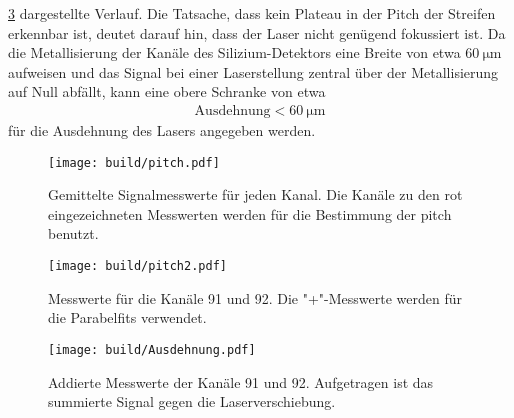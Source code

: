 \ref{fig:Ausdehnung} dargestellte Verlauf. Die Tatsache, dass kein Plateau in der Pitch der Streifen erkennbar ist, deutet darauf hin, dass der Laser
nicht genügend fokussiert ist. Da die Metallisierung der Kanäle des Silizium-Detektors eine Breite von etwa $\SI{60}{\micro\meter}$ aufweisen und das
Signal bei einer Laserstellung zentral über der Metallisierung auf Null abfällt, kann eine obere Schranke von etwa
\begin{align}
  \text{Ausdehnung} < \SI{60}{\micro\meter}
\end{align}
für die Ausdehnung des Lasers angegeben werden.

\begin{figure}
  \centering
  \texttt{[image: build/pitch.pdf]}
  \caption{Gemittelte Signalmesswerte für jeden Kanal. Die Kanäle zu den rot eingezeichneten Messwerten werden für die Bestimmung der pitch benutzt.}
  \label{fig:pitch}
\end{figure}

\begin{figure}
  \centering
  \texttt{[image: build/pitch2.pdf]}
  \caption{Messwerte für die Kanäle 91 und 92. Die "+"-Messwerte werden für die Parabelfits verwendet.}
  \label{fig:pitch2}
\end{figure}

\begin{figure}
  \centering
  \texttt{[image: build/Ausdehnung.pdf]}
  \caption{Addierte Messwerte der Kanäle 91 und 92. Aufgetragen ist das summierte Signal gegen die Laserverschiebung.}
  \label{fig:Ausdehnung}
\end{figure}

